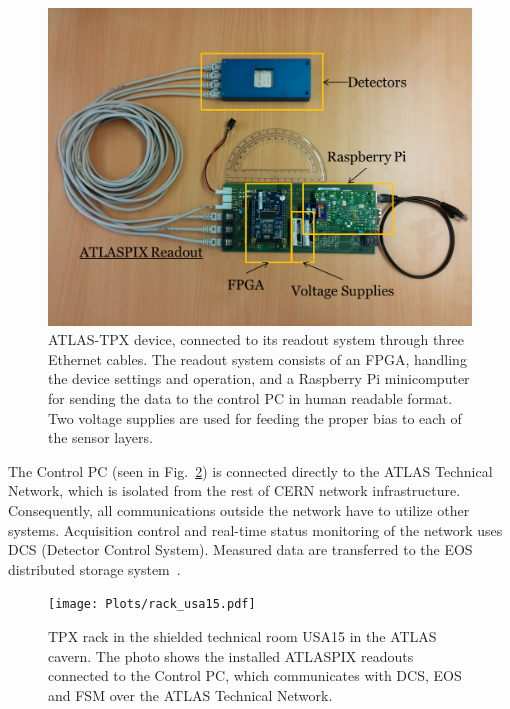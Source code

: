 \begin{figure}[tbp]
	\centering
  \includegraphics[clip, width=.45\textwidth, angle=0]{Plots/ATLASPIX.png}
  \caption {ATLAS-TPX device, connected to its readout system through three Ethernet cables. The readout system consists of an FPGA, handling the device settings and operation, and a Raspberry Pi minicomputer for sending the data to the control PC in human readable format. Two voltage supplies are used for feeding the proper bias to each of the sensor layers.}
  \label{fig:device_with_readout}
\end{figure}

The Control PC (seen in Fig.~\ref{fig:rack}) is connected directly to the ATLAS Technical Network, which is isolated from the rest of CERN network infrastructure. Consequently, all communications outside the network have to utilize other systems. Acquisition control and real-time status monitoring of the network uses DCS (Detector Control System). Measured data are transferred to the EOS distributed storage system~\cite{MAscetti2015,Peters2011}.

\begin{figure}[tbp]
	\centering
  \texttt{[image: Plots/rack\_usa15.pdf]}
  \caption {TPX rack in the shielded technical room USA15 in the ATLAS cavern. The photo shows the installed ATLASPIX readouts connected to the Control PC, which communicates with DCS, EOS and FSM over the ATLAS Technical Network.}
  \label{fig:rack}
\end{figure}
